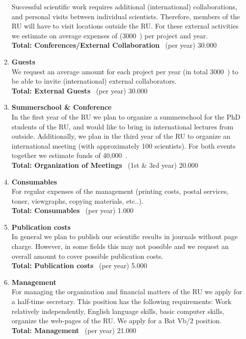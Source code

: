 \documentclass[10pt,fleqn,twoside]{article}
\begin{document}
\begin{enumerate}
Successful scientific work requires additional (international) collaborations, and
personal visits between individual scientists.
Therefore, members of the RU will have to visit locations outside the RU. 
For these external activities we estimate on average expenses of (3000~\EUR)
per project and year.
\\[0.2cm]
 {\bf Total: Conferences/External Collaboration} \, (per year)    \hfill 30.000~\EUR
\\[0.2cm]
%
\item {\bf Guests}\\
We request an average amount for each project per year (in total 3000~\EUR) to
be able to invite (international) external collaborators.
\\[0.2cm]
 {\bf Total: External Guests} \,  (per year)              \hfill 30.000~\EUR
\\[0.2cm]
%
%
\item {\bf Summerschool \& Conference}\\
In the first year of the RU we plan to organize a summerschool for
the PhD students of the RU, and would like to bring in international lectures
from outside.
Additionally, we plan in the third year of the RU to organize an international
meeting (with approximately 100 scientists).
For both events together we estimate funds of 40,000~\EUR. 
\\[0.2cm]
 {\bf Total: Organization of Meetings} \,  (1st \& 3rd year)    \hfill 20.000~\EUR
\\[0.2cm]
%
\item {\bf Consumables}\\
For regular expenses of the management (printing costs, postal services, toner,
viewgraphs, copying materials, etc..).
\\[0.2cm]
 {\bf Total: Consumables} \,  (per year)                 \hfill 1.000~\EUR
\\[0.2cm]
\newpage
\item {\bf Publication costs}\\
In general we plan to publish our scientific results in journals without
page charge. However, in some fields this may not possible and we request 
an overall amount to cover possible publication costs.
\\[0.2cm]
 {\bf Total: Publication costs} \, (per year)              \hfill 5.000~\EUR
\\[0.2cm]
\item {\bf Management}\\
For managing the organization and financial matters of the RU we apply for
a half-time secretary. This position has the following requirements:
Work relatively independently, English language skills, basic computer skills, 
organize the web-pages of the RU.
We apply for a Bat Vb/2 position.
\\[0.2cm]
 {\bf Total: Management} \, (per year)           \hfill 21.000~\EUR
\\[0.2cm]

\end{enumerate}
 
\end{document}
